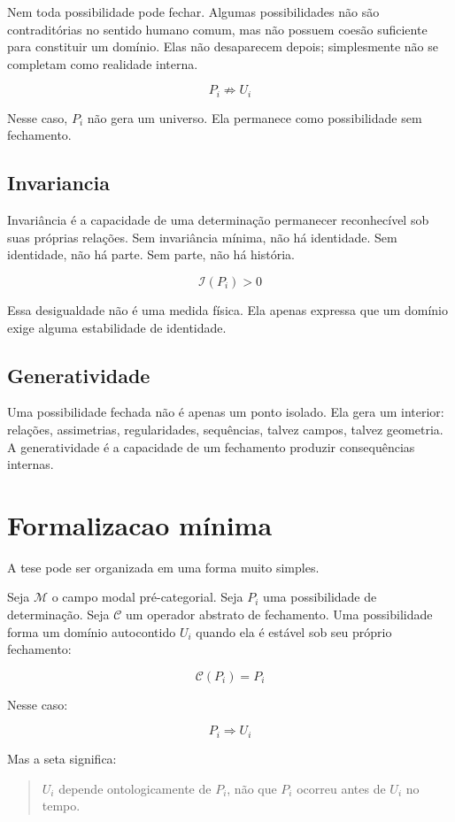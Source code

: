 \documentclass[11pt,a4paper]{article}
\newcommand{\CMP}{\mathcal{M}}
\newcommand{\Ui}{U_i}
\newcommand{\PiM}{P_i}
\newcommand{\Closure}{\mathcal{C}}
\newcommand{\Inv}{\mathcal{I}}
\newcommand{\depends}{\Rightarrow}
\begin{document}
Nem toda possibilidade pode fechar. Algumas possibilidades não são contraditórias no sentido humano comum, mas não possuem coesão suficiente para constituir um domínio. Elas não desaparecem depois; simplesmente não se completam como realidade interna.

\[
\PiM \not\depends \Ui
\]

Nesse caso, \(\PiM\) não gera um universo. Ela permanece como possibilidade sem fechamento.

\subsection{Invariancia}

Invariância é a capacidade de uma determinação permanecer reconhecível sob suas próprias relações. Sem invariância mínima, não há identidade. Sem identidade, não há parte. Sem parte, não há história.

\[
\Inv(\PiM) > 0
\]

Essa desigualdade não é uma medida física. Ela apenas expressa que um domínio exige alguma estabilidade de identidade.

\subsection{Generatividade}

Uma possibilidade fechada não é apenas um ponto isolado. Ela gera um interior: relações, assimetrias, regularidades, sequências, talvez campos, talvez geometria. A generatividade é a capacidade de um fechamento produzir consequências internas.

\section{Formalizacao mínima}

A tese pode ser organizada em uma forma muito simples.

Seja \(\CMP\) o campo modal pré-categorial. Seja \(\PiM\) uma possibilidade de determinação. Seja \(\Closure\) um operador abstrato de fechamento. Uma possibilidade forma um domínio autocontido \(\Ui\) quando ela é estável sob seu próprio fechamento:

\[
\Closure(\PiM) = \PiM
\]

Nesse caso:

\[
\PiM \depends \Ui
\]

Mas a seta significa:

\begin{quote}
\(\Ui\) depende ontologicamente de \(\PiM\), não que \(\PiM\) ocorreu antes de \(\Ui\) no tempo.
\end{quote}
\end{document}

